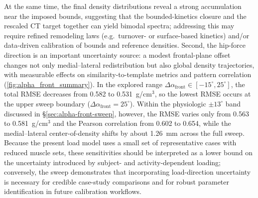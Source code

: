 At the same time, the final density distributions reveal a strong accumulation near the imposed bounds, suggesting that the bounded-kinetics closure and the rescaled CT target together can yield bimodal spectra; addressing this may require refined remodeling laws (e.g.\ turnover- or surface-based kinetics) and/or data-driven calibration of bounds and reference densities.
Second, the hip-force direction is an important uncertainty source: a modest frontal-plane offset changes not only medial--lateral redistribution but also global density trajectories, with measurable effects on similarity-to-template metrics and pattern correlation (\cref{fig:alpha_front_summary}).
In the explored range $\Delta\alpha_{\mathrm{front}}\in[-15^\circ,25^\circ]$, the total RMSE decreases from 0.582 to 0.531~g/cm$^3$, so the lowest RMSE occurs at the upper sweep boundary ($\Delta\alpha_{\mathrm{front}}=25^\circ$). Within the physiologic $\pm 13^\circ$ band discussed in \S\ref{sec:alpha-front-sweep}, however, the RMSE varies only from 0.563 to 0.581~g/cm$^3$ and the Pearson correlation from 0.602 to 0.654, while the medial--lateral center-of-density shifts by about 1.26~mm across the full sweep.
Because the present load model uses a small set of representative cases with reduced muscle sets, these sensitivities should be interpreted as a lower bound on the uncertainty introduced by subject- and activity-dependent loading; conversely, the sweep demonstrates that incorporating load-direction uncertainty is necessary for credible case-study comparisons and for robust parameter identification in future calibration workflows.

